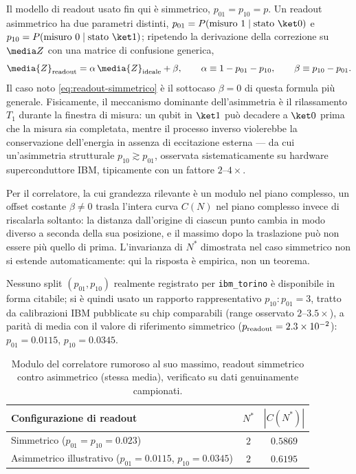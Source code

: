 \documentclass[11pt,a4paper]{article}
\begin{document}
Il modello di readout usato fin qui è simmetrico, $p_{01}=p_{10}=p$. Un
readout asimmetrico ha due parametri distinti,
$p_{01}=P(\text{misuro }1\mid\text{stato }\ket0)$ e
$p_{10}=P(\text{misuro }0\mid\text{stato }\ket1)$; ripetendo la
derivazione della correzione su $\media Z$ con una matrice di confusione
generica,
\begin{equation}
\media{Z}_{\rm readout} = \alpha\,\media{Z}_{\rm ideale} + \beta,
\qquad \alpha \equiv 1-p_{01}-p_{10}, \qquad \beta \equiv p_{10}-p_{01}.
\label{eq:readout-asimmetrico}
\end{equation}
Il caso noto \eqref{eq:readout-simmetrico} è il sottocaso $\beta=0$ di
questa formula più generale. Fisicamente, il meccanismo dominante
dell'asimmetria è il rilassamento $T_1$ durante la finestra di misura: un
qubit in $\ket1$ può decadere a $\ket0$ prima che la misura sia completata,
mentre il processo inverso violerebbe la conservazione dell'energia in
assenza di eccitazione esterna --- da cui un'asimmetria strutturale
$p_{10}\gtrsim p_{01}$, osservata sistematicamente su hardware
superconduttore IBM, tipicamente con un fattore $2$--$4\times$.

Per il correlatore, la cui grandezza rilevante è un modulo nel piano
complesso, un offset costante $\beta\neq0$ trasla l'intera curva $C(N)$
nel piano complesso invece di riscalarla soltanto: la distanza
dall'origine di ciascun punto cambia in modo diverso a seconda della sua
posizione, e il massimo dopo la traslazione può non essere più quello di
prima. L'invarianza di $N^*$ dimostrata nel caso simmetrico non si estende
automaticamente: qui la risposta è empirica, non un teorema.

Nessuno split $(p_{01},p_{10})$ realmente registrato per
\texttt{ibm\_torino} è disponibile in forma citabile; si è quindi usato un
rapporto rappresentativo $p_{10}:p_{01}=3$, tratto da calibrazioni IBM
pubblicate su chip comparabili (range osservato $2$--$3.5\times$), a
parità di media con il valore di riferimento simmetrico
($p_{\rm readout}=2.3\times10^{-2}$): $p_{01}=0.0115$, $p_{10}=0.0345$.

\begin{table}[htbp]
\centering
\renewcommand{\arraystretch}{1.2}
\begin{tabular}{@{}lcc@{}}
\toprule
Configurazione di readout & $N^*$ & $|C(N^*)|$\\
\midrule
Simmetrico ($p_{01}=p_{10}=0.023$) & $2$ & $0.5869$\\
Asimmetrico illustrativo ($p_{01}=0.0115$, $p_{10}=0.0345$) & $2$ & $0.6195$\\
\bottomrule
\end{tabular}
\caption{Modulo del correlatore rumoroso al suo massimo, readout
simmetrico contro asimmetrico (stessa media), verificato su dati
genuinamente campionati.}
\label{tab:readout-asimmetrico}
\end{table}
\end{document}
